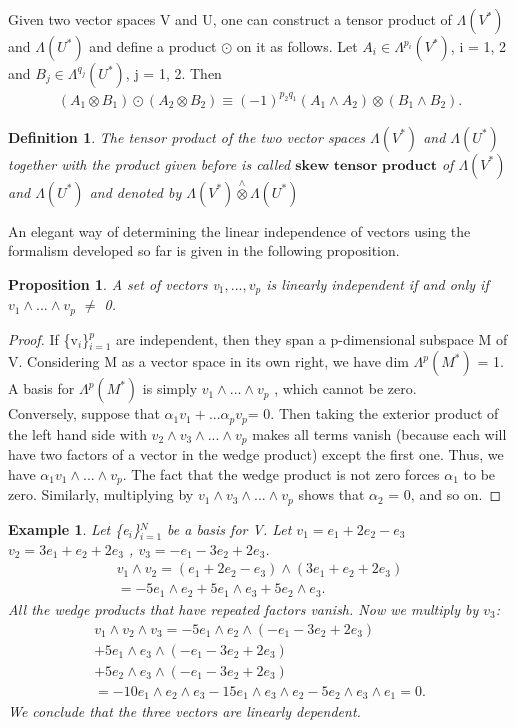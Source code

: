 \documentclass[12pt,a4paper]{article}
\newtheorem{defn}[thm]{Definition}
\newtheorem{exmp}{Example}[section]
\newtheorem{prop}{Proposition}
\begin{document}
\indent Given two vector spaces V and U, one can construct a tensor product
of $\Lambda(V^*)$ and $\Lambda(U^*)$ and define a product $\odot$ on it as follows. Let $A_i \in \Lambda^{p_i}(V^*)$, i = 1, 2 and  $B_j \in \Lambda^{q_j}(U^*)$, j = 1, 2. Then \\
\begin{eqnarray*}
(A_1 \otimes B_1) \odot (A_2 \otimes B_2) \equiv (-1)^{p_2 q_1}(A_1 \wedge A_2) \otimes ( B_1 \wedge B_2). 
\end{eqnarray*}
\begin{defn}
The tensor product of the two vector spaces $\Lambda(V^*)$ and $\Lambda(U^*)$ together with the product given before is called $\textbf{skew tensor product}$ of  $\Lambda(V^*)$ and $\Lambda(U^*)$ and denoted by  $\Lambda(V^*) \overset{\wedge}{\otimes} \Lambda(U^*)$
\end{defn}
An elegant way of determining the linear independence of vectors using
the formalism developed so far is given in the following proposition.\\
\begin{prop}\label{prop1}
A set of vectors v$_1,...,v_p$ is linearly independent if
and only if $v_1 \wedge ... \wedge v_p$ $\ne$ 0.
\end{prop}
\begin{proof}
If \{v$_i$\}$^p_{i=1}$ are independent, then they span a p-dimensional subspace M of V. Considering M as a vector space in its own right, we have
dim  $\Lambda^{p}(M^*)$ = 1. A basis for $\Lambda^{p}(M^*)$ is simply $v_1 \wedge ... \wedge v_p$ , which cannot
be zero. \\
\indent Conversely, suppose that $\alpha_1 v_1 + ... \alpha_p v_p $= 0. Then taking the exterior
product of the left hand side with $v_2 \wedge v_3 \wedge ... \wedge v_p$ makes all terms vanish (because
each will have two factors of a vector in the wedge product) except the first
one. Thus, we have $\alpha_1 v_1 \wedge ... \wedge v_p $.  The fact that the wedge product is
not zero forces $\alpha_1$ to be zero. Similarly, multiplying by $v_1 \wedge v_3 \wedge ... \wedge v_p$ shows that $\alpha_2$ = 0, and so on.
\end{proof}
\begin{exmp}
Let \{e$_i$\}$^N_{i=1}$ be a basis for V. Let $v_1 = e_1 + 2e_2 - e_3$ $v_2 = 3e_1 + e_2 + 2e_3$ , $v_3 = -e_1 - 3e_2 + 2 e_3$.
\begin{eqnarray*}
v_1 \wedge v_2 = ( e_1 + 2e_2 - e_3) \wedge (3e_1 + e_2 + 2e_3)\\
= -5e_1 \wedge e_2 + 5e_1 \wedge e_3 + 5 e_2 \wedge e_3.
\end{eqnarray*}	
All the wedge products that have repeated factors vanish. Now we multiply
by $v_3$: 
\begin{eqnarray*}
v_1 \wedge v_2 \wedge v_3 = -5e_1 \wedge e_2 \wedge ( -e_1 - 3e_2 + 2e_3) \\+ 5e_1 \wedge e_3 \wedge ( -e_1 -3e_2 + 2e_3)  \\+5e_2 \wedge
e_3 \wedge (-e_1 - 3e_2 + 2e_3)\\
= -10e_1 \wedge e_2 \wedge e_3 - 15e_1 \wedge e_3 \wedge e_2 - 5e_2 \wedge e_3 \wedge e_1 = 0.
\end{eqnarray*}
We conclude that the three vectors are linearly dependent.
\end{exmp}
\end{document}
